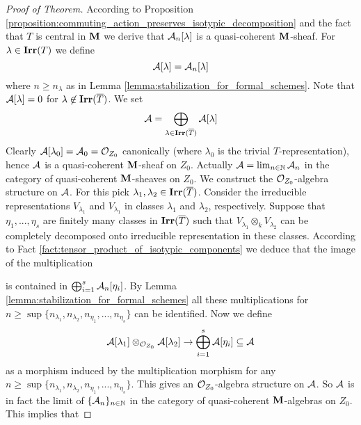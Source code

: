 \begin{proof}[Proof of Theorem]
According to Proposition \ref{proposition:commuting_action_preserves_isotypic_decomposition} and the fact that $T$ is central in $\mathbf{M}$ we derive that ${\mathcal A}_n[\lambda]$ is a quasi-coherent $\mathbf{M}$-sheaf. For $\lambda\in \mathbf{Irr}(T)$ we define
$${\mathcal A}[\lambda] = {\mathcal A}_n[\lambda]$$
where $n\geq n_{\lambda}$ as in Lemma \ref{lemma:stabilization_for_formal_schemes}. Note that ${\mathcal A}[\lambda] = 0$ for $\lambda \not \in \mathbf{Irr}(\overline{T})$. We set
$${\mathcal A}=\bigoplus_{\lambda\in \mathbf{Irr}(\overline{T})}{\mathcal A}[\lambda]$$
Clearly ${\mathcal A}[\lambda_0] = {\mathcal A}_0 = {\mathcal O}_{Z_0}$ canonically (where $\lambda_0$ is the trivial $T$-representation), hence ${\mathcal A}$ is a quasi-coherent $\mathbf{M}$-sheaf on $Z_0$. Actually ${\mathcal A}=\lim_{n\in {\mathbb N}}{\mathcal A}_n$ in the category of quasi-coherent $\mathbf{M}$-sheaves on $Z_0$. We construct the ${\mathcal O}_{Z_0}$-algebra structure on ${\mathcal A}$. For this pick $\lambda_1, \lambda_2\in \mathbf{Irr}(\overline{T})$. Consider the irreducible representations $V_{\lambda_1}$ and $V_{\lambda_1}$ in classes $\lambda_1$ and $\lambda_2$, respectively. Suppose that $\eta_1,...,\eta_s$ are finitely many classes in $\mathbf{Irr}(\overline{T})$ such that $V_{\lambda_1}\otimes_k V_{\lambda_2}$ can be completely decomposed onto irreducible representation in these classes. According to Fact \ref{fact:tensor_product_of_isotypic_components} we deduce that the image of the multiplication
\begin{center}
\end{center}
is contained in $\bigoplus_{i=1}^s{\mathcal A}_n[\eta_i]$. By Lemma \ref{lemma:stabilization_for_formal_schemes} all these multiplications for $n\geq \sup \{n_{\lambda_1},n_{\lambda_2},n_{\eta_1},...,n_{\eta_s}\}$ can be identified. Now we define
$${\mathcal A}[\lambda_1]\otimes_{{\mathcal O}_{Z_0}} {\mathcal A}[\lambda_2]\rightarrow  \bigoplus_{i=1}^s{\mathcal A}[\eta_i]\subseteq {\mathcal A}$$
as a morphism induced by the multiplication morphism for any $n\geq \sup\{n_{\lambda_1},n_{\lambda_2},n_{\eta_1},...,n_{\eta_s}\}$. This gives an ${\mathcal O}_{Z_0}$-algebra structure on ${\mathcal A}$. So ${\mathcal A}$ is in fact the limit of $\{{\mathcal A}_n\}_{n\in {\mathbb N}}$ in the category of quasi-coherent $\mathbf{M}$-algebras on $Z_0$. This implies that

\end{proof}
